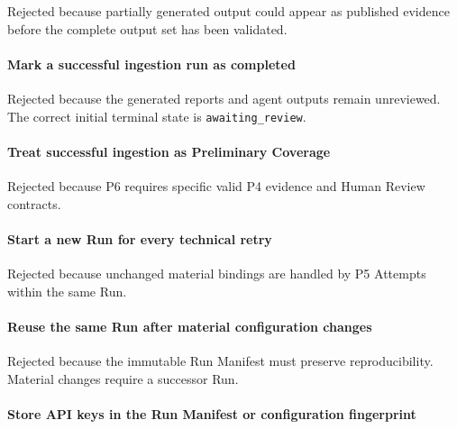 Rejected because partially generated output could appear as published evidence before the complete output set has been validated.

\hypertarget{mark-a-successful-ingestion-run-as-completed}{%
\paragraph{Mark a successful ingestion run as completed}\label{mark-a-successful-ingestion-run-as-completed}}

Rejected because the generated reports and agent outputs remain unreviewed. The correct initial terminal state is \texttt{awaiting\_review}.

\hypertarget{treat-successful-ingestion-as-preliminary-coverage}{%
\paragraph{Treat successful ingestion as Preliminary Coverage}\label{treat-successful-ingestion-as-preliminary-coverage}}

Rejected because P6 requires specific valid P4 evidence and Human Review contracts.

\hypertarget{start-a-new-run-for-every-technical-retry}{%
\paragraph{Start a new Run for every technical retry}\label{start-a-new-run-for-every-technical-retry}}

Rejected because unchanged material bindings are handled by P5 Attempts within the same Run.

\hypertarget{reuse-the-same-run-after-material-configuration-changes}{%
\paragraph{Reuse the same Run after material configuration changes}\label{reuse-the-same-run-after-material-configuration-changes}}

Rejected because the immutable Run Manifest must preserve reproducibility. Material changes require a successor Run.

\hypertarget{store-api-keys-in-the-run-manifest-or-configuration-fingerprint}{%
\paragraph{Store API keys in the Run Manifest or configuration fingerprint}\label{store-api-keys-in-the-run-manifest-or-configuration-fingerprint}}


